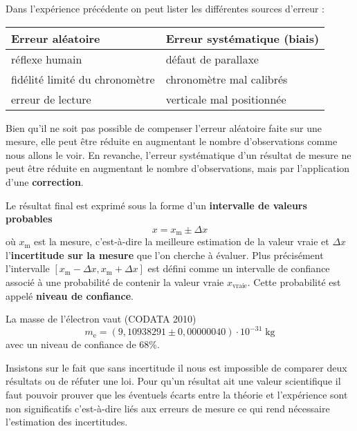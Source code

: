 \begin{kaoexample}[frametitle=Exemple]
Dans l'expérience précédente on peut lister les différentes sources d'erreur :
\begin{center}
	\begin{tabular}{l|l}
	\textbf{Erreur aléatoire}		& \textbf{Erreur systématique (biais)}\\
	\midrule
	réflexe humain					& défaut de parallaxe\\
	fidélité limité du chronomètre	&	chronomètre mal calibrés\\
	erreur de lecture				&	verticale mal positionnée\\				 
	\end{tabular}
\end{center}
\end{kaoexample} 
\begin{kaobox}[frametitle=Correction d'un biais]
Bien qu'il ne soit pas possible de compenser l'erreur aléatoire faite sur une mesure, elle peut être réduite en augmentant le nombre d'observations comme nous allons le voir. En revanche, l'erreur systématique d'un résultat de mesure ne peut être réduite en augmentant le nombre d'observations, mais par l'application d'une \textbf{correction}.
\end{kaobox}

Le résultat final est exprimé sous la forme d'un \textbf{intervalle de valeurs probables}
\[
x=x_\text{m} \pm \Delta x
\]
où $x_\text{m}$ est la mesure, c'est-à-dire la meilleure estimation de la valeur vraie et $\Delta x$ l'\textbf{incertitude sur la mesure} que l'on cherche à évaluer. Plus précisément l'intervalle $[x_\text{m}-\Delta x,x_\text{m}+\Delta x]$ est défini comme un intervalle de confiance associé à une probabilité de contenir la valeur vraie $x_\text{vraie}$. Cette probabilité est appelé \textbf{niveau de confiance}.

\begin{kaoexample}[frametitle=Exemple]
La masse de l'électron vaut (CODATA 2010)
\[
m_\text{e}=(9,109 382 91\pm 0,000 000 40)\cdot 10^{-31}\;\mathrm{kg}	
\]
avec un niveau de confiance de 68\%.
\end{kaoexample} 

Insistons sur le fait que sans incertitude il nous est impossible de comparer deux résultats ou de réfuter une loi. Pour qu'un résultat ait une valeur scientifique il faut pouvoir prouver que les éventuels écarts entre la théorie et l'expérience sont non significatifs c'est-à-dire liés aux erreurs de mesure ce qui rend nécessaire l'estimation des incertitudes. 
